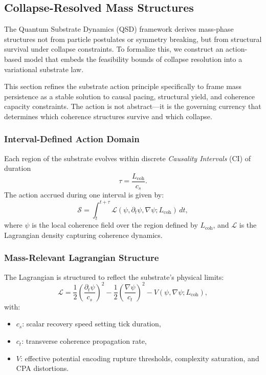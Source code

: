 \documentclass[preprints,article,submit,pdftex,moreauthors]{Definitions/mdpi}
\begin{document}
\subsection{Collapse-Resolved Mass Structures}

The Quantum Substrate Dynamics (QSD) framework derives mass-phase structures not from particle postulates or symmetry breaking, but from structural survival under collapse constraints. To formalize this, we construct an action-based model that embeds the feasibility bounds of collapse resolution into a variational substrate law.

This section refines the substrate action principle specifically to frame mass persistence as a stable solution to causal pacing, structural yield, and coherence capacity constraints. The action is not abstract—it is the governing currency that determines which coherence structures survive and which collapse.

\subsubsection*{Interval-Defined Action Domain}

Each region of the substrate evolves within discrete \emph{Causality Intervals} (CI) of duration 
\[
\tau = \frac{L_{\mathrm{coh}}}{c_s}.
\]
The action accrued during one interval is given by:
\begin{equation}
\mathcal{S} = \int_{t}^{t+\tau} \mathcal{L}(\psi, \partial_t \psi, \nabla \psi; L_{\mathrm{coh}})\, dt,
\end{equation}
where \( \psi \) is the local coherence field over the region defined by \( L_{\mathrm{coh}} \), and \( \mathcal{L} \) is the Lagrangian density capturing coherence dynamics.

\subsubsection*{Mass-Relevant Lagrangian Structure}

The Lagrangian is structured to reflect the substrate’s physical limits:
\begin{equation}
\mathcal{L} = \frac{1}{2}\left(\frac{\partial_t \psi}{c_s}\right)^2 
- \frac{1}{2}\left(\frac{\nabla \psi}{c_t}\right)^2 
- V(\psi, \nabla \psi; L_{\mathrm{coh}}),
\end{equation}
with:
\begin{itemize}
  \item \( c_s \): scalar recovery speed setting tick duration,
  \item \( c_t \): transverse coherence propagation rate,
  \item \( V \): effective potential encoding rupture thresholds, complexity saturation, and CPA distortions.
\end{itemize}
\end{document}
